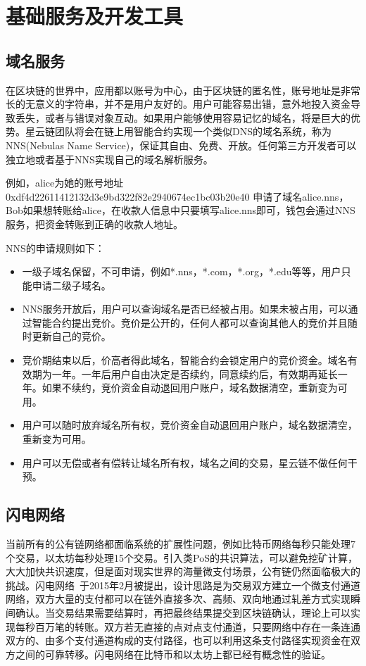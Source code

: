 \section{基础服务及开发工具}
\label{sec:tools}

\subsection{域名服务}

在区块链的世界中，应用都以账号为中心，由于区块链的匿名性，账号地址是非常长的无意义的字符串，并不是用户友好的。用户可能容易出错，意外地投入资金导致丢失，或者与错误对象互动。如果用户能够使用容易记忆的域名，将是巨大的优势。星云链团队将会在链上用智能合约实现一个类似DNS的域名系统，称为NNS(Nebulas Name Service)，保证其自由、免费、开放。任何第三方开发者可以独立地或者基于NNS实现自己的域名解析服务。

例如，alice为她的账号地址 0xdf4d22611412132d3e9bd322f82e2940674ec1bc03b20e40 申请了域名alice.nns，Bob如果想转账给alice，在收款人信息中只要填写alice.nns即可，钱包会通过NNS服务，把资金转账到正确的收款人地址。

NNS的申请规则如下：
\begin{itemize}
	\item 一级子域名保留，不可申请，例如*.nns，*.com，*.org，*.edu等等，用户只能申请二级子域名。
	\item NNS服务开放后，用户可以查询域名是否已经被占用。如果未被占用，可以通过智能合约提出竞价。竞价是公开的，任何人都可以查询其他人的竞价并且随时更新自己的竞价。
	\item 竞价期结束以后，价高者得此域名，智能合约会锁定用户的竞价资金。域名有效期为一年。一年后用户自由决定是否续约，同意续约后，有效期再延长一年。如果不续约，竞价资金自动退回用户账户，域名数据清空，重新变为可用。
	\item 用户可以随时放弃域名所有权，竞价资金自动退回用户账户，域名数据清空，重新变为可用。
	\item 用户可以无偿或者有偿转让域名所有权，域名之间的交易，星云链不做任何干预。
\end{itemize}


\subsection{闪电网络}
当前所有的公有链网络都面临系统的扩展性问题，例如比特币网络每秒只能处理7个交易，以太坊每秒处理15个交易。引入类PoS的共识算法，可以避免挖矿计算，大大加快共识速度，但是面对现实世界的海量微支付场景，公有链仍然面临极大的挑战。闪电网络~\cite{poon2015bitcoin}于2015年2月被提出，设计思路是为交易双方建立一个微支付通道网络，双方大量的支付都可以在链外直接多次、高频、双向地通过轧差方式实现瞬间确认。当交易结果需要结算时，再把最终结果提交到区块链确认，理论上可以实现每秒百万笔的转账。双方若无直接的点对点支付通道，只要网络中存在一条连通双方的、由多个支付通道构成的支付路径，也可以利用这条支付路径实现资金在双方之间的可靠转移。闪电网络在比特币和以太坊上都已经有概念性的验证。

